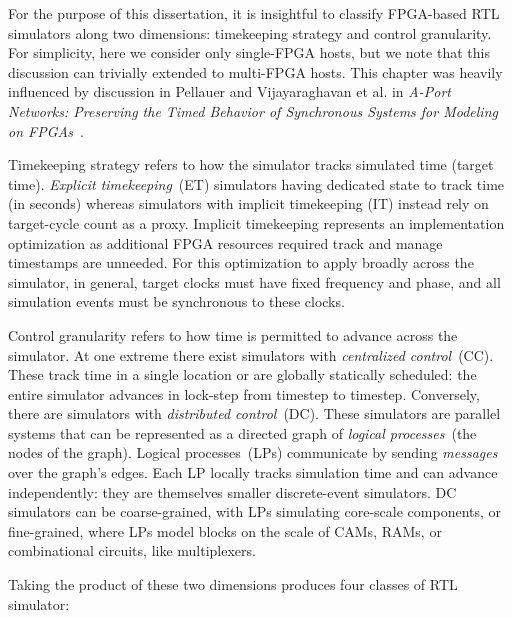 
For the purpose of this dissertation, it is insightful to classify FPGA-based
RTL simulators along two dimensions: timekeeping strategy and control
granularity. For simplicity, here we consider only single-FPGA hosts, but we
note that this discussion can trivially extended to multi-FPGA hosts. This
chapter was heavily influenced by discussion in Pellauer and Vijayaraghavan et
al. in \emph{A-Port Networks: Preserving the Timed Behavior of Synchronous
Systems for Modeling on FPGAs}~\cite{APortNetworks}.

Timekeeping strategy refers to how the simulator tracks simulated time (target time). \emph{Explicit timekeeping}~(ET)
simulators having dedicated state to track time (in seconds) whereas simulators with implicit
timekeeping (IT) instead rely on target-cycle count as a proxy. Implicit timekeeping represents an
implementation optimization as additional FPGA resources required track and
manage timestamps are unneeded. For this optimization to apply broadly across
the simulator, in general, target clocks must have fixed frequency and phase, and
all simulation events must be synchronous to these clocks.

Control granularity refers to how time is permitted to advance across the simulator. At one extreme there exist
simulators with \emph{centralized control}~(CC). These track time in
a single location or are globally statically scheduled: the entire simulator advances in lock-step from
timestep to timestep.  Conversely, there are simulators with \emph{distributed
control}~(DC). These simulators are parallel systems that can be represented as a directed graph of \emph{logical
processes}~(the nodes of the graph). Logical processes~(LPs) communicate by sending \emph{messages} over the graph's edges.
Each LP locally tracks simulation time and can advance independently: they are themselves smaller discrete-event simulators. DC
simulators can be coarse-grained, with LPs simulating core-scale components, or
fine-grained, where LPs model blocks on the scale of CAMs, RAMs, or
combinational circuits, like multiplexers.

Taking the product of these two dimensions produces four classes of RTL simulator:

